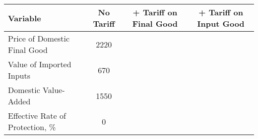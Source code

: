 \begin{table}[ht]
    \centering
    \begin{tabular}{lc|c|c}
    \toprule
     Variable & No Tariff & + Tariff on Final Good & + Tariff on Input Good \\
    \midrule
     Price of Domestic Final Good & 2220 & & \\
     \midrule
     Value of Imported Inputs & 670 & & \\
     \midrule
     Domestic Value-Added & 1550 & & \\
    \midrule
     Effective Rate of Protection, \% & 0 & & \\
     \bottomrule 
    \end{tabular}
    \label{tab:my_label}
\end{table}